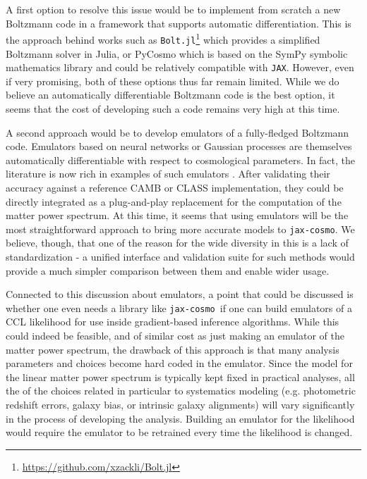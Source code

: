 \documentclass[twocolumn,twocolappendix,nofootinbib,iop]{openjournal}
\newcommand{\jaxcosmo}{\texttt{jax-cosmo}}
\newcommand{\jax}{\texttt{JAX}}
\begin{document}
A first option to resolve this issue would be to implement from scratch a new Boltzmann code in a framework that supports automatic differentiation. This is the approach behind works such as \texttt{Bolt.jl}\footnote{\url{https://github.com/xzackli/Bolt.jl}} which provides a simplified Boltzmann solver in Julia, or PyCosmo \citep{pycosmo} which is based on the SymPy symbolic mathematics library and could be relatively compatible with \jax. However, even if very promising, both of these options thus far remain limited. While we do believe an automatically differentiable Boltzmann code is the best option, it seems that the cost of developing such a code remains very high at this time.

A second approach would be to develop emulators of a fully-fledged Boltzmann code. Emulators based on neural networks or Gaussian processes are themselves automatically differentiable with respect to cosmological parameters. In fact, the literature is now rich in examples of such emulators \citep[e.g.][and references therein]{Gunther_2022, nygaard,cosmopower,cosmicnet, emucmb}. After validating their accuracy against a reference CAMB or CLASS implementation, they could be directly integrated as a plug-and-play replacement for the computation of the matter power spectrum. At this time, it seems that using emulators will be the most straightforward approach to bring more accurate models to \jaxcosmo. We believe, though,  that one of the reason for the wide diversity in this is a lack of standardization - a unified interface and validation suite for such methods would provide a much simpler comparison between them and enable wider usage.

\bigskip


Connected to this discussion about emulators, a point that could be discussed is whether one even needs a library like \jaxcosmo\ if one can build emulators of a CCL likelihood for use inside gradient-based inference algorithms. While this could indeed be feasible, and of similar cost as just making an emulator of the matter power spectrum, the drawback of this approach is that many analysis parameters and choices become hard coded in the emulator. Since the model for the linear matter power spectrum is typically kept fixed in practical analyses, all the of the choices related in particular to systematics modeling (e.g. photometric redshift errors, galaxy bias, or intrinsic galaxy alignments) will vary significantly in the process of developing the analysis. Building an emulator for the likelihood would require the emulator to be retrained every time the likelihood is changed.
\end{document}
